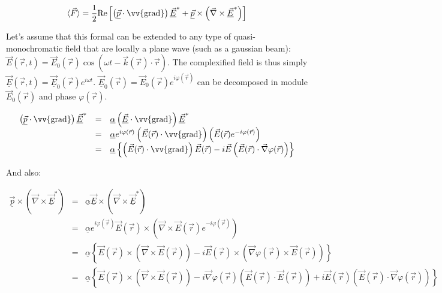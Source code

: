 \documentclass[reprint,amsmath,amssymb,aps,nofootinbib]{revtex4-1}
\begin{document}
\[
\langle\vec{F}\rangle=\frac{1}{2}\text{Re}\left[\left(\underline{\vec{p}}\cdot\vv{\text{grad}}\right)\underline{\vec{E}}^{*}+\underline{\vec{p}}\times\left(\vec{\nabla}\times\underline{\vec{E}}^{*}\right)\right]
\]

Let's assume that this formal can be extended to any type of quasi-monochromatic field that are locally a plane wave (such as a gaussian beam): $\vec{E}(\vec{r},t)=\vec{E}_{0}(\vec{r})\cos(\omega t - \vec{k}(\vec{r})\cdot \vec{r})$. The complexified field is thus simply $\underline{\vec{E}}(\vec{r},t)=\underline{\vec{E}}_{0}(\vec{r})e^{i\omega t}$. $\underline{\vec{E}}_{0}(\vec{r})=\vec{E}_{0}(\vec{r})e^{i\varphi(\vec{r})}$ can be decomposed in module $\vec{E}_{0}(\vec{r})$ and phase $\varphi(\vec{r})$.


\[
\begin{array}{lllll}

\left(\underline{\vec{p}}\cdot\vv{\text{grad}}\right)\underline{\vec{E}}^{*}
&=&
\underline{\alpha}\left(\underline{\vec{E}}\cdot\vv{\text{grad}}\right)\underline{\vec{E}}^{*} \\
&=&
\underline{\alpha} e^{i\varphi(\vec{r})}\left(\vec{E}(\vec{r})\cdot\vv{\text{grad}}\right)\left(\vec{E}(\vec{r})e^{-i\varphi(\vec{r})}\right) \\
&=&
\underline{\alpha}\left\lbrace \left(\vec{E}(\vec{r})\cdot\vv{\text{grad}}\right)\vec{E}(\vec{r})-i\vec{E}\left(\vec{E}(\vec{r})\cdot\vec{\nabla}\varphi(\vec{r})\right)\right\rbrace \\

\end{array}
\]

And also:

\[
\begin{array}{lllll}

\underline{\vec{p}}\times\left(\vec{\nabla}\times\underline{\vec{E}}^{*}\right) 
&=&
\underline{\alpha}\underline{\vec{E}}\times\left(\vec{\nabla}\times\underline{\vec{E}}^{*}\right) \\
&=&
\underline{\alpha}e^{i\varphi(\vec{r})}\vec{E}(\vec{r})\times\left(\vec{\nabla}\times\vec{E}(\vec{r})e^{-i\varphi(\vec{r})}\right) \\
&=&
\underline{\alpha}\left\lbrace \vec{E}(\vec{r})\times\left(\vec{\nabla}\times\vec{E}(\vec{r})\right)-i\vec{E}(\vec{r})\times\left(\vec{\nabla}\varphi(\vec{r})\times\vec{E}(\vec{r})\right)\right\rbrace \\
&=&
\underline{\alpha}\left\lbrace \vec{E}(\vec{r})\times\left(\vec{\nabla}\times\vec{E}(\vec{r})\right)-i\vec{\nabla}\varphi(\vec{r})\left(\vec{E}(\vec{r})\cdot\vec{E}(\vec{r})\right)+i\vec{E}(\vec{r})\left(\vec{E}(\vec{r})\cdot\vec{\nabla}\varphi(\vec{r})\right)\right\rbrace \\

\end{array}
\]
\end{document}
